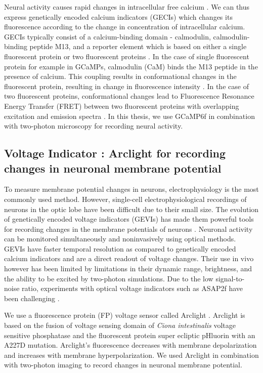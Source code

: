 Neural activity causes rapid changes in intracellular free calcium \parencite{Baker1971, Sabatini2002, Egelhaaf1995}. We can thus express genetically encoded calcium indicators (GECIs) which changes its fluorescence according to the change in concentration of intracellular calcium. GECIs typically consist of a calcium-binding domain - calmodulin, calmodulin-binding peptide M13, and a reporter element which is based on either a single fluorescent protein or two fluorescent proteins \parencite{Broussard2014}. In the case of single fluorescent protein for example in GCaMPs, calmodulin (CaM) binds the M13 peptide in the presence of calcium. This coupling results in conformational changes in the fluorescent protein, resulting in change in fluorescence intensity \parencite{Nagai2001}. In the case of two fluorescent proteins, conformational changes lead to Fluorescence Resonance Energy Transfer (FRET) between two fluorescent proteins with overlapping excitation and emission spectra \parencite{Miyawaki1997}. In this thesis, we use GCaMP6f  \parencite{Chen2013} in combination with two-photon microscopy for recording neural activity.

\subsection{Voltage Indicator : Arclight for recording changes in neuronal membrane potential}
To measure membrane potential changes in neurons, electrophysiology is the most commonly used method. However, single-cell electrophysiological recordings of neurons in the optic lobe have been difficult due to their small size. The evolution of genetically encoded voltage indicators (GEVIs) has made them powerful tools for recording changes in the membrane potentials of neurons \parencite{Yang2016}. Neuronal activity can be monitored simultaneously and noninvasively using optical methods. GEVIs have faster temporal resolution as compared to genetically encoded calcium indicators and are a direct readout of voltage changes. Their use in vivo however has been limited by limitations in their dynamic range, brightness, and the ability to be excited by two-photon simulations. Due to the low signal-to-noise ratio, experiments with optical voltage indicators such as ASAP2f have been challenging \parencite{Yang2016}.

We use a fluorescence protein (FP) voltage sensor called Arclight \parencite{Jin2012}. Arclight is based on the fusion of voltage sensing domain of \textit{Ciona intestinalis} voltage sensitive phosphatase \parencite{Murata2005} and the fluorescent protein super ecliptic pHluorin with an A227D mutation. Arclight's fluorescence decreases with membrane depolarization and increases with membrane hyperpolarization. We used Arclight in combination with two-photon imaging to record changes in neuronal membrane potential.

